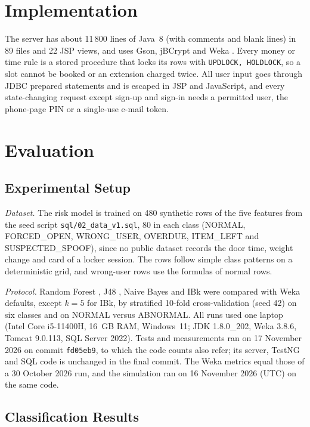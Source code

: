 \documentclass[sigconf,screen]{acmart}
\newcommand{\revisioncommit}{fd05eb9}
\begin{document}
\section{Implementation}\label{sec:impl}

The server has about 11\,800 lines of Java~8 (with comments and blank lines) in 89 files and 22 JSP views, and uses
Gson, jBCrypt
\cite{provos1999bcrypt} and Weka \cite{hall2009weka}. Every money or time rule is a stored procedure
that locks its rows with \texttt{UPDLOCK, HOLDLOCK}, so a slot cannot be booked or an extension charged twice. All user
input goes through JDBC prepared statements and is escaped in JSP and JavaScript, and every state-changing request
except sign-up and sign-in needs a permitted user, the phone-page PIN or a single-use e-mail token.

\section{Evaluation}\label{sec:ml}

\subsection{Experimental Setup}

\textit{Dataset.} The risk model is trained on 480 synthetic rows of the five features from the seed script
\texttt{sql/02\_data\_v1.sql}, 80 in each class (NORMAL, FORCED\_OPEN, WRONG\_USER, OVERDUE, ITEM\_LEFT and
SUSPECTED\_SPOOF), since no public dataset records the door time, weight change and card of a locker session. The
rows follow simple class patterns on a deterministic grid, and wrong-user rows use the formulas of normal rows.

\textit{Protocol.} Random Forest \cite{breiman2001rf}, J48 \cite{quinlan1993c45}, Naive Bayes \cite{john1995nb} and
IBk \cite{aha1991ibl} were compared with Weka defaults, except $k=5$ for IBk, by stratified 10-fold cross-validation
\cite{kohavi1995cv} (seed 42) on six classes and on NORMAL versus ABNORMAL. All runs used one laptop (Intel Core
i5-11400H, 16~GB RAM, Windows~11; JDK 1.8.0\_202, Weka 3.8.6, Tomcat 9.0.113, SQL Server 2022). Tests and measurements
ran on 17 November 2026 on commit \texttt{\revisioncommit}, to which the code counts also refer; its server, TestNG and
SQL code is unchanged in the final commit. The Weka metrics equal those of a 30 October 2026 run, and the simulation
ran on 16 November 2026 (UTC) on the same code.

\subsection{Classification Results}
\end{document}
